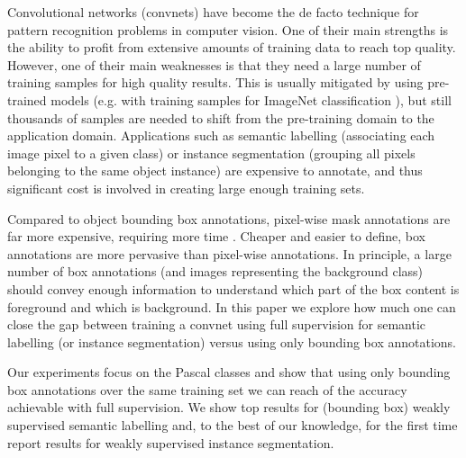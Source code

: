 \documentclass[10pt,english,british,twocolumn]{article}
\begin{document}
Convolutional networks (convnets) have become the de facto technique
for pattern recognition problems in computer vision. One of their
main strengths is the ability to profit from extensive amounts of
training data to reach top quality. However, one of their main weaknesses
is that they need a large number of training samples for high quality
results. This is usually mitigated by using pre-trained models (e.g.
with  training samples for ImageNet classification
\cite{Russakovsky2015Ijcv}), but still thousands of samples are needed
to shift from the pre-training domain to the application domain. Applications
such as semantic labelling (associating each image pixel to a given
class) or instance segmentation (grouping all pixels belonging to
the same object instance) are expensive to annotate, and thus significant
cost is involved in creating large enough training sets.

Compared to object bounding box annotations, pixel-wise mask annotations
are far more expensive, requiring  more
time \cite{Lin2014EccvCoco}. Cheaper and easier to define, box annotations
are more pervasive than pixel-wise annotations. In principle, a large
number of box annotations (and images representing the background
class) should convey enough information to understand which part of
the box content is foreground and which is background. In this paper
we explore how much one can close the gap between training a convnet
using full supervision for semantic labelling (or instance segmentation)
versus using only bounding box annotations.

Our experiments focus on the  Pascal classes \cite{Everingham15}
and show that using only bounding box annotations over the same training
set we can reach  of the accuracy achievable
with full supervision. We show top results for (bounding box) weakly
supervised semantic labelling and, to the best of our knowledge, for
the first time report results for weakly supervised instance segmentation.
\end{document}
